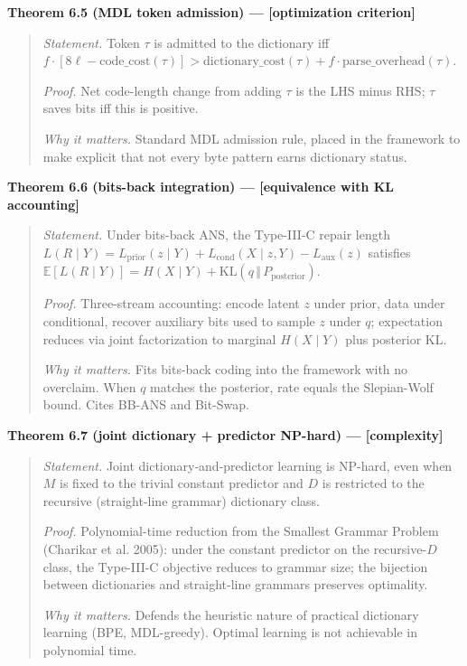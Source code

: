 \documentclass[
]{article}
\begin{document}
\textbf{Theorem 6.5 (MDL token admission) --- {[}optimization
criterion{]}}

\begin{quote}
\emph{Statement.} Token $\tau$ is admitted to the dictionary iff
$f \cdot [8\ell - \mathrm{code\_cost}(\tau)] > \mathrm{dictionary\_cost}(\tau) + f \cdot \mathrm{parse\_overhead}(\tau)$.

\emph{Proof.} Net code-length change from adding $\tau$ is the LHS
minus RHS; $\tau$ saves bits iff this is positive.

\emph{Why it matters.} Standard MDL admission rule, placed in the
framework to make explicit that not every byte pattern earns
dictionary status.
\end{quote}

\textbf{Theorem 6.6 (bits-back integration) --- {[}equivalence with KL
accounting{]}}

\begin{quote}
\emph{Statement.} Under bits-back ANS, the Type-III-C repair length
$L(R \mid Y) = L_{\text{prior}}(z \mid Y) + L_{\text{cond}}(X \mid z, Y) - L_{\text{aux}}(z)$
satisfies
$\mathbb{E}[L(R \mid Y)] = H(X \mid Y) + \mathrm{KL}(q \,\Vert\, P_{\text{posterior}})$.

\emph{Proof.} Three-stream accounting: encode latent $z$ under
prior, data under conditional, recover auxiliary bits used to sample
$z$ under $q$; expectation reduces via joint factorization to
marginal $H(X \mid Y)$ plus posterior KL.

\emph{Why it matters.} Fits bits-back coding into the framework with
no overclaim. When $q$ matches the posterior, rate equals the
Slepian-Wolf bound. Cites BB-ANS and Bit-Swap.
\end{quote}

\textbf{Theorem 6.7 (joint dictionary + predictor NP-hard) ---
{[}complexity{]}}

\begin{quote}
\emph{Statement.} Joint dictionary-and-predictor learning is
NP-hard, even when $M$ is fixed to the trivial constant predictor and
$D$ is restricted to the recursive (straight-line grammar) dictionary
class.

\emph{Proof.} Polynomial-time reduction from the Smallest Grammar
Problem (Charikar et al. 2005): under the constant predictor on the
recursive-$D$ class, the Type-III-C objective reduces to grammar
size; the bijection between dictionaries and straight-line grammars
preserves optimality.

\emph{Why it matters.} Defends the heuristic nature of practical
dictionary learning (BPE, MDL-greedy). Optimal learning is not
achievable in polynomial time.
\end{quote}
\end{document}

